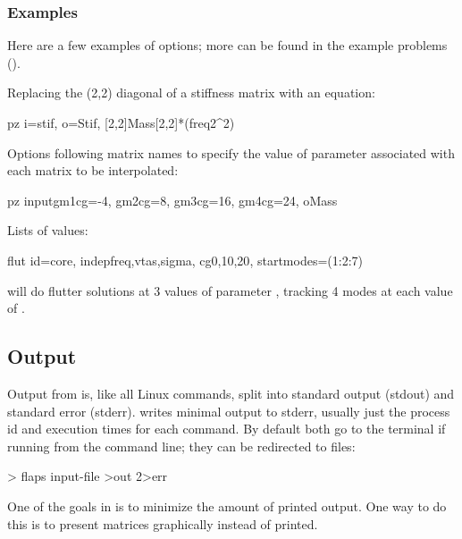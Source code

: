 \subsubsection{Examples}
Here are a few examples of options; more can be found in the
example problems ().
\par
Replacing the (2,2) diagonal of a stiffness matrix with an equation:
\begin{example}
   pz { i=stif, o=Stif, [2,2]{Mass[2,2]*(freq2^2)} }
\end{example}
\par
Options following matrix names to specify the value of parameter 
associated with each matrix to be interpolated:
\begin{example}
   pz {input{gm1{cg=-4}, gm2{cg=8}, gm3{cg=16}, gm4{cg=24}}, o{Mass}}
\end{example}
\par
Lists of values:
\begin{example}
   flut { id=core, indep{freq,vtas,sigma},
         cg{0,10,20}, start{modes=(1:2:7)} }
\end{example}
will do flutter solutions at 3 values of parameter ,
tracking 4 modes at each value of .
\par

\subsection{Output}
Output from \flaps is, like all Linux commands, split into standard output
(stdout)
and standard error (stderr).
\flaps writes minimal output to stderr, usually just the process id and
execution times for each command. By default both go to the terminal if
running from the command line; they can be redirected to files:
\begin{example}
> flaps input-file >out 2>err
\end{example}

One of the goals in \flaps is to minimize the amount of printed
output. One way to do this is to present matrices graphically
instead of printed.

